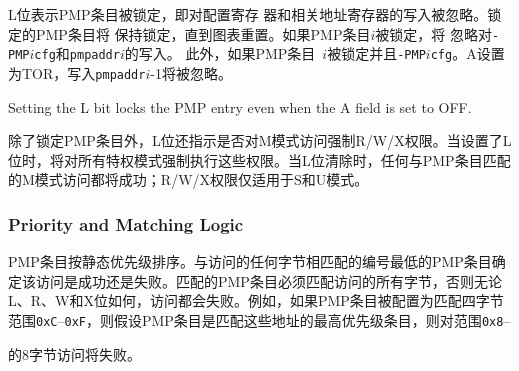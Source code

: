 {\iffalse
The L bit indicates that the PMP entry is locked, i.e., writes to the
configuration register and associated address registers are ignored.  Locked
PMP entries remain locked until the hart is reset.  If PMP entry $i$ is
locked, writes to {\tt pmp}$i${\tt cfg} and {\tt pmpaddr}$i$ are ignored.
Additionally, if PMP entry~$i$ is locked and {\tt pmp}$i${\tt cfg}.A is set
to TOR, writes to {\tt pmpaddr}$i$-1 are ignored.
\fi
L位表示PMP条目被锁定，即对配置寄存
器和相关地址寄存器的写入被忽略。锁定的PMP条目将
保持锁定，直到图表重置。如果PMP条目$i$被锁定，将
忽略对{\tt-PMP}$i${\tt cfg}和{\tt pmpaddr}$i$的写入。
此外，如果PMP条目~$i$被锁定并且{\tt-PMP}$i${\tt cfg}。A设置为TOR，写入{\tt pmpaddr}$i$-1将被忽略。

\begin{commentary}
Setting the L bit locks the PMP entry even when the A field is set to OFF.
\end{commentary}


\iffalse
In addition to locking the PMP entry, the L bit indicates whether the R/W/X
permissions are enforced on M-mode accesses.  When the L bit is set, these
permissions are enforced for all privilege modes.  When the L bit is clear,
any M-mode access matching the PMP entry will succeed; the R/W/X
permissions apply only to S and U modes.
\fi
除了锁定PMP条目外，L位还指示是否对M模式访问强制R/W/X权限。当设置了L位时，将对所有特权模式强制执行这些权限。当L位清除时，任何与PMP条目匹配的M模式访问都将成功；R/W/X权限仅适用于S和U模式。


\subsubsection*{Priority and Matching Logic}

\iffalse
PMP entries are statically prioritized.  The lowest-numbered PMP entry that
matches any byte of an access determines whether that access succeeds or
fails.  The matching PMP entry must match all bytes of an access, or the
access fails, irrespective of the L, R, W, and X bits.  For example, if a PMP
entry is configured to match the four-byte range {\tt 0xC}--{\tt 0xF}, then an
8-byte access to the range {\tt 0x8}--{\tt 0xF} will fail, assuming that
PMP entry is the highest-priority entry that matches those addresses.
\fi
PMP条目按静态优先级排序。与访问的任何字节相匹配的编号最低的PMP条目确定该访问是成功还是失败。匹配的PMP条目必须匹配访问的所有字节，否则无论L、R、W和X位如何，访问都会失败。例如，如果PMP条目被配置为匹配四字节范围{\tt 0xC}--{\tt0xF}，则假设PMP条目是匹配这些地址的最高优先级条目，则对范围{\tt 0x8}--}的8字节访问将失败。

